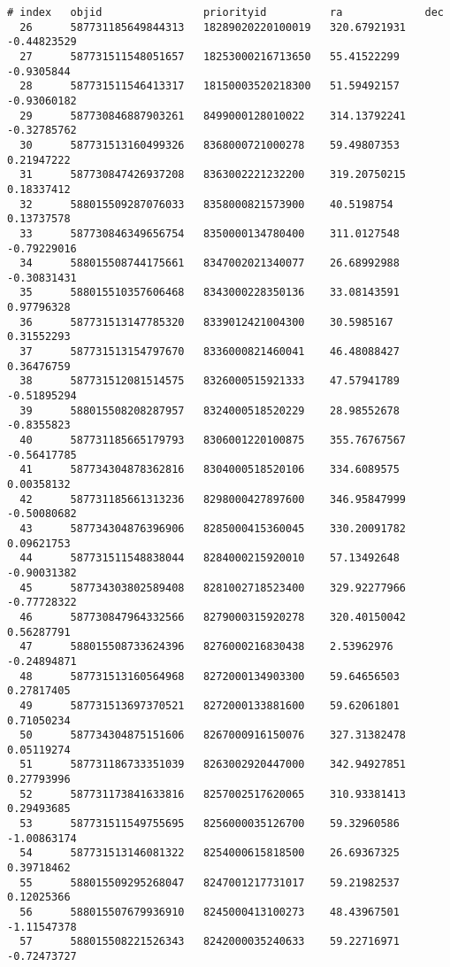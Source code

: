 \documentclass[a4paper,11pt]{article}
\begin{document}
\begin{verbatim}
# index   objid                priorityid          ra             dec          
  26      587731185649844313   18289020220100019   320.67921931   -0.44823529  
  27      587731511548051657   18253000216713650   55.41522299    -0.9305844   
  28      587731511546413317   18150003520218300   51.59492157    -0.93060182  
  29      587730846887903261   8499000128010022    314.13792241   -0.32785762  
  30      587731513160499326   8368000721000278    59.49807353    0.21947222   
  31      587730847426937208   8363002221232200    319.20750215   0.18337412   
  32      588015509287076033   8358000821573900    40.5198754     0.13737578   
  33      587730846349656754   8350000134780400    311.0127548    -0.79229016  
  34      588015508744175661   8347002021340077    26.68992988    -0.30831431  
  35      588015510357606468   8343000228350136    33.08143591    0.97796328   
  36      587731513147785320   8339012421004300    30.5985167     0.31552293   
  37      587731513154797670   8336000821460041    46.48088427    0.36476759   
  38      587731512081514575   8326000515921333    47.57941789    -0.51895294  
  39      588015508208287957   8324000518520229    28.98552678    -0.8355823   
  40      587731185665179793   8306001220100875    355.76767567   -0.56417785  
  41      587734304878362816   8304000518520106    334.6089575    0.00358132   
  42      587731185661313236   8298000427897600    346.95847999   -0.50080682  
  43      587734304876396906   8285000415360045    330.20091782   0.09621753   
  44      587731511548838044   8284000215920010    57.13492648    -0.90031382  
  45      587734303802589408   8281002718523400    329.92277966   -0.77728322  
  46      587730847964332566   8279000315920278    320.40150042   0.56287791   
  47      588015508733624396   8276000216830438    2.53962976     -0.24894871  
  48      587731513160564968   8272000134903300    59.64656503    0.27817405   
  49      587731513697370521   8272000133881600    59.62061801    0.71050234   
  50      587734304875151606   8267000916150076    327.31382478   0.05119274   
  51      587731186733351039   8263002920447000    342.94927851   0.27793996   
  52      587731173841633816   8257002517620065    310.93381413   0.29493685   
  53      587731511549755695   8256000035126700    59.32960586    -1.00863174  
  54      587731513146081322   8254000615818500    26.69367325    0.39718462   
  55      588015509295268047   8247001217731017    59.21982537    0.12025366   
  56      588015507679936910   8245000413100273    48.43967501    -1.11547378  
  57      588015508221526343   8242000035240633    59.22716971    -0.72473727  

\end{verbatim}
\end{document}
